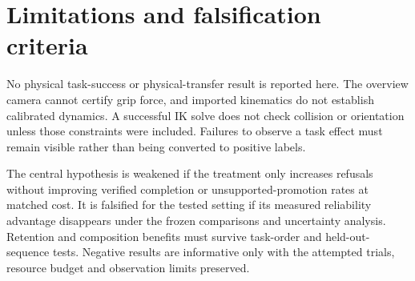 \documentclass[conference]{IEEEtran}
\begin{document}
\section{Limitations and falsification criteria}
No physical task-success or physical-transfer result is reported here. The overview camera cannot certify grip force, and imported kinematics do not establish calibrated dynamics. A successful IK solve does not check collision or orientation unless those constraints were included. Failures to observe a task effect must remain visible rather than being converted to positive labels.

The central hypothesis is weakened if the treatment only increases refusals without improving verified completion or unsupported-promotion rates at matched cost. It is falsified for the tested setting if its measured reliability advantage disappears under the frozen comparisons and uncertainty analysis. Retention and composition benefits must survive task-order and held-out-sequence tests. Negative results are informative only with the attempted trials, resource budget and observation limits preserved.

\clearpage


\end{document}
